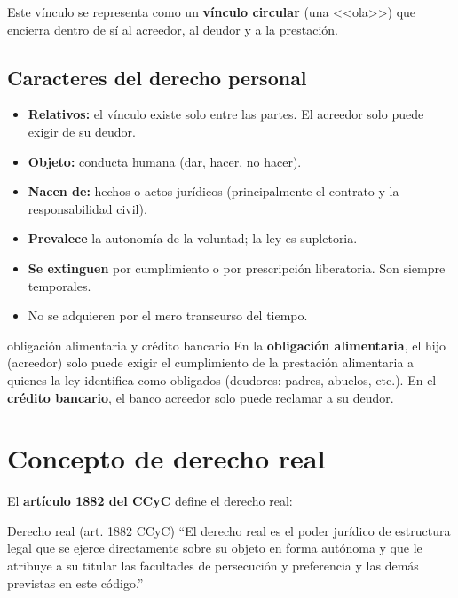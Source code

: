 \documentclass[12pt,oneside]{book}
\begin{document}
Este v\'inculo se representa como un \textbf{v\'inculo circular} (una <<ola>>) que encierra dentro de s\'i al acreedor, al deudor y a la prestaci\'on.

\subsection{Caracteres del derecho personal}

\begin{itemize}
    \item \textbf{Relativos:} el v\'inculo existe solo entre las partes. El acreedor solo puede exigir de su deudor.
    \item \textbf{Objeto:} conducta humana (dar, hacer, no hacer).
    \item \textbf{Nacen de:} hechos o actos jur\'idicos (principalmente el contrato y la responsabilidad civil).
    \item \textbf{Prevalece} la autonom\'ia de la voluntad; la ley es supletoria.
    \item \textbf{Se extinguen} por cumplimiento o por prescripci\'on liberatoria. Son siempre temporales.
    \item No se adquieren por el mero transcurso del tiempo.
\end{itemize}

\begin{example}{obligaci\'on alimentaria y cr\'edito bancario}
En la \textbf{obligaci\'on alimentaria}, el hijo (acreedor) solo puede exigir el cumplimiento de la prestaci\'on alimentaria a quienes la ley identifica como obligados (deudores: padres, abuelos, etc.). En el \textbf{cr\'edito bancario}, el banco acreedor solo puede reclamar a su deudor.
\end{example}

\section{Concepto de derecho real}

El \textbf{art\'iculo 1882 del CCyC} define el derecho real:

\begin{definition}{Derecho real (art. 1882 CCyC)}
``El derecho real es el poder jur\'idico de estructura legal que se ejerce directamente sobre su objeto en forma aut\'onoma y que le atribuye a su titular las facultades de persecuci\'on y preferencia y las dem\'as previstas en este c\'odigo.''
\end{definition}
\end{document}
